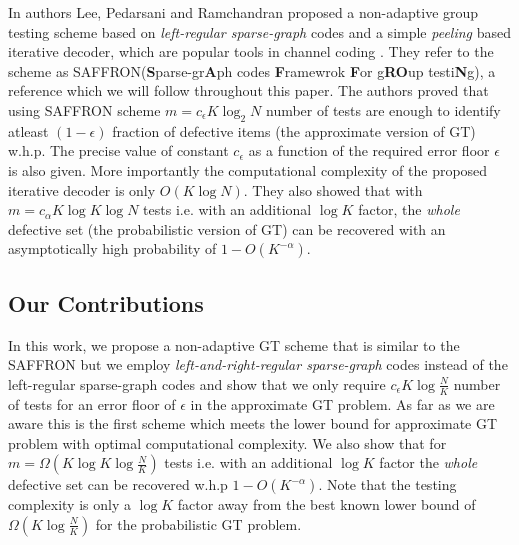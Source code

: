 \documentclass[conference,twocolumn]{IEEEtran}
\begin{document}
In \cite{lee2015saffron} authors Lee, Pedarsani and Ramchandran proposed a non-adaptive group testing scheme based on \textit{left-regular sparse-graph} codes and a simple \textit{peeling} based iterative decoder, which are popular tools in channel coding \cite{richardson2008modern}. They refer to the scheme as SAFFRON(\textbf{S}parse-gr\textbf{A}ph codes \textbf{F}ramewrok \textbf{F}or g\textbf{RO}up testi\textbf{N}g), a reference which we will follow throughout this paper. The authors proved that using SAFFRON scheme $m=c_\epsilon K\log_2 N$ number of tests are enough to identify atleast $(1-\epsilon)$ fraction of defective items (the approximate version of GT) w.h.p. The precise value of constant $c_\epsilon$ as a function of the required error floor $\epsilon$ is also given. More importantly the computational complexity of the proposed iterative decoder is only $O(K\log N)$. They also showed that with $m=c_\alpha K\log K \log N$ tests  i.e. with an additional $\log K$ factor, the \textit{whole} defective set (the probabilistic version of GT) can be recovered with an asymptotically high probability of $1-O(K^{-\alpha})$.

\subsection*{Our Contributions}
In this work, we propose a non-adaptive GT scheme that is similar to the SAFFRON but we employ \textit{left-and-right-regular sparse-graph} codes instead of the left-regular sparse-graph codes and show that we only require $c_\epsilon K\log \frac{N}{K}$ number of tests for an error floor of $\epsilon$ in the approximate GT problem.
As far as we are aware this is the first scheme which meets the lower bound for approximate GT problem with optimal computational complexity. We also show that for $m=\Omega( K\log K \log \frac{N}{K})$ tests  i.e. with an additional $\log K$ factor the \textit{whole} defective set can be recovered w.h.p $1-O(K^{-\alpha})$. Note that the testing complexity is only a $\log K$ factor away from the best known lower bound of $\Omega(K\log \frac{N}{K})$ \cite{chan2014non} for the probabilistic GT problem.
\end{document}
